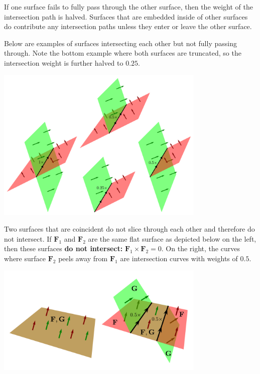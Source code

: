 \documentclass{book}
\begin{document}
If one surface fails to fully pass through the other surface, then the weight of the intersection path is halved. Surfaces that are embedded inside of other surfaces do contribute any intersection paths unless they enter or leave the other surface. 

Below are examples of surfaces intersecting each other but not fully passing through. Note the bottom example where both surfaces are truncated, so the intersection weight is further halved to \(0.25\).

\begin{center}
\includegraphics[width = 0.75\textwidth]{Intersections/Surface-surface_intersections/surface_surface_intersection_boundary_case}
\end{center}

Two surfaces that are coincident do not slice through each other and therefore do not intersect. If \(\mathbf{F}_1\) and \(\mathbf{F}_2\) are the same flat surface as depicted below on the left, then these surfaces {\bf do not intersect:} \(\mathbf{F}_1 \times \mathbf{F}_2 = 0\). On the right, the curves where surface \(\mathbf{F}_2\) peels away from \(\mathbf{F}_1\) are intersection curves with weights of \(0.5\).

\begin{center}
\includegraphics[width = 0.75\textwidth]{Intersections/Surface-surface_intersections/coincident_surfaces}
\end{center}
\end{document}
